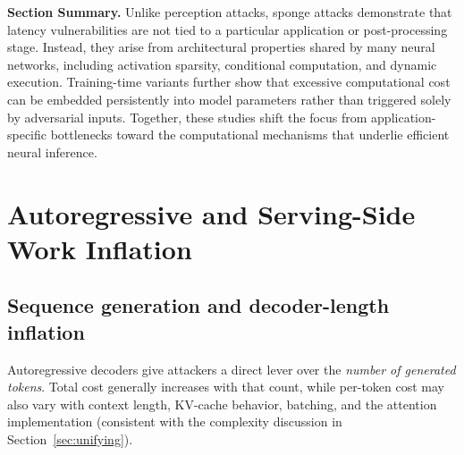 \documentclass[acmsmall,screen,review,nonacm]{acmart}
\begin{document}

\textbf{Section Summary.} Unlike perception attacks, sponge attacks demonstrate that latency vulnerabilities are not tied to a particular application or post-processing stage. Instead, they arise from architectural properties shared by many neural networks, including activation sparsity, conditional computation, and dynamic execution. Training-time variants further show that excessive computational cost can be embedded persistently into model parameters rather than triggered solely by adversarial inputs. Together, these studies shift the focus from application-specific bottlenecks toward the computational mechanisms that underlie efficient neural inference.
\section{Autoregressive and Serving-Side Work Inflation}
\label{sec:seqgen}

\subsection{Sequence generation and decoder-length inflation}

Autoregressive decoders give attackers a direct lever over the \emph{number of generated tokens}. Total cost generally increases with that count, while per-token cost may also vary with context length, KV-cache behavior, batching, and the attention implementation (consistent with the complexity discussion in Section~\ref{sec:unifying}).
\end{document}
